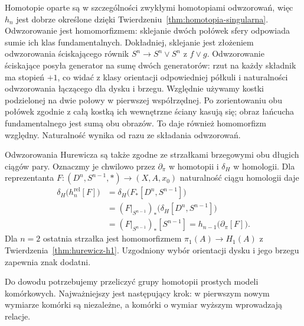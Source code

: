 Homotopie oparte są w
szczególności zwykłymi
homotopiami odwzorowań, więc
$h_n$ jest dobrze
określone dzięki
Twierdzeniu~\ref{thm:homotopia-singularna}.
Odwzorowanie jest homomorfizmem:
sklejanie dwóch połówek
sfery odpowiada sumie
ich klas fundamentalnych.
Dokładniej, sklejanie jest złożeniem odwzorowania ściskającego równik
$S^n\to S^n\vee S^n$ z $f\vee g$. Odwzorowanie ściskające posyła
generator na sumę dwóch generatorów: rzut na każdy składnik
ma stopień $+1$, co widać z klasy orientacji odpowiedniej półkuli
i naturalności odwzorowania łączącego dla dysku i brzegu.
Względnie używamy kostki podzielonej na dwie połowy w pierwszej współrzędnej.
Po zorientowaniu obu połówek zgodnie z całą kostką ich wewnętrzne
ściany kasują się; obraz łańcucha fundamentalnego jest sumą obu obrazów.
To daje również homomorfizm względny. Naturalność wynika od razu ze składania odwzorowań.

Odwzorowania Hurewicza są także zgodne ze strzałkami brzegowymi
obu długich ciągów pary. Oznaczmy je chwilowo przez
$\partial_\pi$ w homotopii i $\delta_H$ w homologii.
Dla reprezentanta $F:(D^n,S^{n-1},*)\to(X,A,x_0)$ naturalność
ciągu homologii daje
\[
 \begin{aligned}
 \delta_H\bigl(h_n^{\mathrm{rel}}[F]\bigr)
 &=\delta_H\bigl(F_*[D^n,S^{n-1}]\bigr)\\
 &=(F|_{S^{n-1}})_*\bigl(\delta_H[D^n,S^{n-1}]\bigr)\\
 &=(F|_{S^{n-1}})_*[S^{n-1}]
 =h_{n-1}\bigl(\partial_\pi[F]\bigr).
 \end{aligned}
\]
Dla $n=2$ ostatnia strzałka jest homomorfizmem
$\pi_1(A)\to H_1(A)$ z Twierdzenia~\ref{thm:hurewicz-h1}.
Uzgodniony wybór orientacji dysku i jego brzegu zapewnia znak dodatni.

Do dowodu potrzebujemy
przeliczyć grupy homotopii
prostych modeli komórkowych.
Najważniejszy jest
następujący krok: w
pierwszym nowym wymiarze
komórki są niezależne,
a komórki o wymiar
wyższym wprowadzają
relacje.

